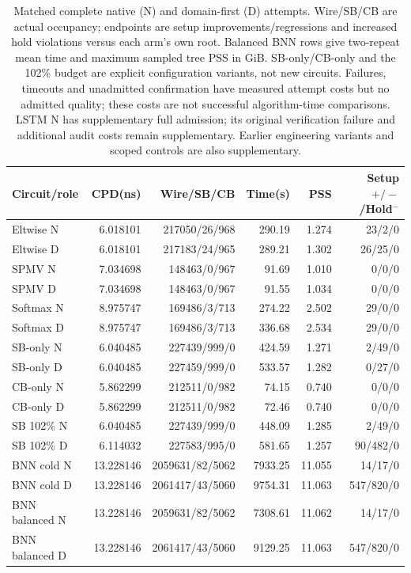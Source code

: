 \documentclass[conference,10pt]{IEEEtran}
\begin{document}
\begin{table}[t]
\centering\footnotesize\setlength{\tabcolsep}{3pt}
\caption{Matched complete native (N) and domain-first (D) attempts. Wire/SB/CB are actual occupancy; endpoints are setup improvements/regressions and increased hold violations versus each arm's own root. Balanced BNN rows give two-repeat mean time and maximum sampled tree PSS in GiB. SB-only/CB-only and the 102\% budget are explicit configuration variants, not new circuits. Failures, timeouts and unadmitted confirmation have measured attempt costs but no admitted quality; these costs are not successful algorithm-time comparisons. LSTM N has supplementary full admission; its original verification failure and additional audit costs remain supplementary. Earlier engineering variants and scoped controls are also supplementary.}
\label{tab:completecost}
\begin{tabular}{lrrrrr}\hline
Circuit/role & CPD(ns) & Wire/SB/CB & Time(s) & PSS & Setup $+/-$/Hold$^-$\\\hline
Eltwise N&6.018101&217050/26/968&290.19&1.274&23/2/0\\
Eltwise D&6.018101&217183/24/965&289.21&1.302&26/25/0\\
SPMV N&7.034698&148463/0/967&91.69&1.010&0/0/0\\
SPMV D&7.034698&148463/0/967&91.55&1.034&0/0/0\\
Softmax N&8.975747&169486/3/713&274.22&2.502&29/0/0\\
Softmax D&8.975747&169486/3/713&336.68&2.534&29/0/0\\
SB-only N&6.040485&227439/999/0&424.59&1.271&2/49/0\\
SB-only D&6.040485&227459/999/0&533.57&1.282&0/27/0\\
CB-only N&5.862299&212511/0/982&74.15&0.740&0/0/0\\
CB-only D&5.862299&212511/0/982&72.46&0.740&0/0/0\\
SB 102\% N&6.040485&227439/999/0&448.09&1.285&2/49/0\\
SB 102\% D&6.114032&227583/995/0&581.65&1.257&90/482/0\\
BNN cold N&13.228146&2059631/82/5062&7933.25&11.055&14/17/0\\
BNN cold D&13.228146&2061417/43/5060&9754.31&11.063&547/820/0\\
BNN balanced N&13.228146&2059631/82/5062&7308.61&11.062&14/17/0\\
BNN balanced D&13.228146&2061417/43/5060&9129.25&11.063&547/820/0\\

\end{tabular}
\end{table}
\end{document}
